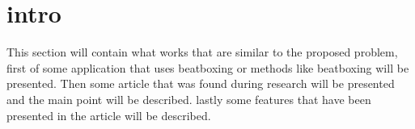 \section{intro}
This section will contain what works that are similar to the proposed problem, first of some application that uses beatboxing or methods like beatboxing will be presented. Then some article that was found during research will be presented and the main point will be described. lastly some features that have been presented in the article will be described.